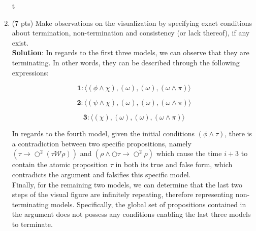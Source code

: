 \documentclass[12pt]{article}
\begin{document}
\begin{spacing}{1.5}
\begin{enumerate}
\begin{center}
t
		      			      			      			      			      	            
		      \end{center}
		      		      		      		      		              
		      		      		      		      		              
		\item (7 pts) Make observations on the visualization by specifying exact conditions about termination, non-termination and consistency (or lack thereof), if any exist.\\
		      		      		      		      
		      \textbf{Solution}: In regards to the first three models, we can observe that they are terminating. In other words, they can be described through the following expressions:
		      		      		      		      
		      $$\textbf{1}: \langle (\phi \land \chi), (\omega), (\omega), (\omega \land \pi) \rangle$$
		      		      		      		      
		      $$\textbf{2}: \langle (\psi \land \chi), (\omega),(\omega),(\omega \land \pi) \rangle$$
		      		      		      		      
		      $$\textbf{3}: \langle (\chi), (\omega),(\omega),(\omega \land \pi) \rangle $$
		      		      		      		      
		      In regards to the fourth model, given the initial conditions $(\phi \land \tau)$, there is a contradiction between two specific propositions, namely $(\tau \rightarrow \bigcirc^2(\tau \mathcal{W} \rho))$ and $(\rho \land \bigcirc \tau \rightarrow \bigcirc^2 \rho)$ which cause the time $i+3$ to contain the atomic proposition $\tau$ in both its true and false form, which contradicts the argument and falsifies this specific model.\\
		      		      		      		                      
		      Finally, for the remaining two models, we can determine that the last two steps of the visual figure are infinitely repeating, therefore representing non-terminating models. Specifically, the global set of propositions contained in the argument does not possess any conditions enabling the last three models to terminate.\\
		      		      		      		      

\end{enumerate}
\end{spacing}
\end{document}
